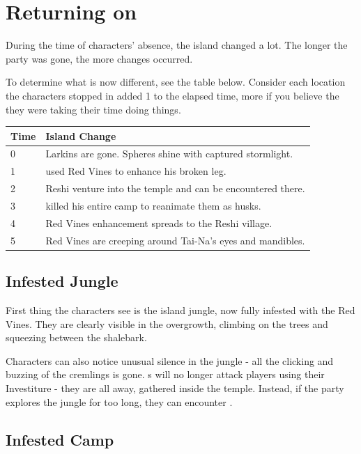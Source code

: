 \section{Returning on \theIsland{}}
\label{sec:returnToTheIsland}

During the time of characters' absence, the island changed a lot. The longer the party was gone, the more changes occurred. 

To determine what is now different, see the table below. Consider each location the characters stopped in added 1 to the elapsed time, more if you believe the they were taking their time doing things. \\

\begin{tabular}{p{0.8cm} p{6.5cm}}
	Time & Island Change \\ \hline
	0 & Larkins are gone. Spheres shine with captured stormlight. \\
	1 & \npcMedic{} used Red Vines to enhance his broken leg. \\
	2 & Reshi venture into the temple and can be encountered there. \\
	3 & \npcMedic{} killed his entire camp to reanimate them as husks. \\
	4 & Red Vines enhancement spreads to the Reshi village. \\
	5 & Red Vines are creeping around Tai-Na's eyes and mandibles. \\	
\end{tabular}

\subsection{Infested Jungle}

First thing the characters see is the island jungle, now fully infested with the Red Vines. They are clearly visible in the overgrowth, climbing on the trees and squeezing between the shalebark.

Characters can also notice unusual silence in the jungle - all the clicking and buzzing of the cremlings is gone. \enemyLarkin{}s will no longer attack players using their Investiture - they are all away, gathered inside the temple. Instead, if the party explores the jungle for too long, they can encounter \enemyReanimatedRemains{}.

\subsection{Infested Camp}

